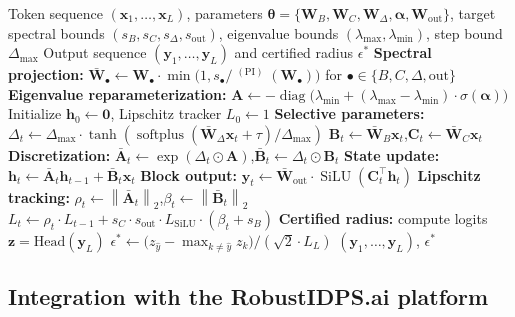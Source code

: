 \documentclass[journal,a4paper,10pt]{IEEEtran}
\theoremstyle{definition}
\theoremstyle{remark}
\newcommand{\modelname}{LipMamba}
\newcommand{\norm}[1]{\left\|#1\right\|}
\DeclareMathOperator{\softplus}{softplus}
\DeclareMathOperator{\diag}{diag}
\DeclareMathOperator{\sigmamax}{\sigma_{max}}
\DeclareMathOperator{\SiLU}{SiLU}
\begin{document}
\begin{algorithm}[!t]
\small
\caption{\modelname{} Forward Pass with Certified Radius}
\label{alg:lipmamba}
\begin{algorithmic}[1]
\REQUIRE Token sequence $(\mathbf{x}_1, \ldots, \mathbf{x}_L)$, parameters $\bm{\theta} = \{\mathbf{W}_B, \mathbf{W}_C, \mathbf{W}_\Delta, \bm{\alpha}, \mathbf{W}_{\mathrm{out}}\}$, target spectral bounds $(s_B, s_C, s_\Delta, s_{\mathrm{out}})$, eigenvalue bounds $(\lambda_{\max}, \lambda_{\min})$, step bound $\Delta_{\max}$
\ENSURE Output sequence $(\mathbf{y}_1, \ldots, \mathbf{y}_L)$ and certified radius $\epsilon^*$
\STATE \textbf{Spectral projection:} $\bar{\mathbf{W}}_\bullet \gets \mathbf{W}_\bullet \cdot \min\bigl(1, s_\bullet / \sigmamax^{\mathrm{(PI)}}(\mathbf{W}_\bullet)\bigr)$ for $\bullet \in \{B, C, \Delta, \mathrm{out}\}$ \quad {}
\STATE \textbf{Eigenvalue reparameterization:} $\mathbf{A} \gets -\diag\bigl(\lambda_{\min} + (\lambda_{\max} - \lambda_{\min}) \cdot \sigma(\bm{\alpha})\bigr)$
\STATE Initialize $\mathbf{h}_0 \gets \mathbf{0}$, Lipschitz tracker $L_0 \gets 1$
    \STATE \textbf{Selective parameters:} $\Delta_t \gets \Delta_{\max} \cdot \tanh(\softplus(\bar{\mathbf{W}}_\Delta \mathbf{x}_t + \tau) / \Delta_{\max})$
    \STATE \quad $\mathbf{B}_t \gets \bar{\mathbf{W}}_B \mathbf{x}_t$,\quad $\mathbf{C}_t \gets \bar{\mathbf{W}}_C \mathbf{x}_t$
    \STATE \textbf{Discretization:} $\bar{\mathbf{A}}_t \gets \exp(\Delta_t \odot \mathbf{A})$,\quad $\bar{\mathbf{B}}_t \gets \Delta_t \odot \mathbf{B}_t$
    \STATE \textbf{State update:} $\mathbf{h}_t \gets \bar{\mathbf{A}}_t \mathbf{h}_{t-1} + \bar{\mathbf{B}}_t \mathbf{x}_t$
    \STATE \textbf{Block output:} $\mathbf{y}_t \gets \bar{\mathbf{W}}_{\mathrm{out}} \cdot \SiLU(\mathbf{C}_t^\top \mathbf{h}_t)$
    \STATE \textbf{Lipschitz tracking:} $\rho_t \gets \norm{\bar{\mathbf{A}}_t}_2$,\quad $\beta_t \gets \norm{\bar{\mathbf{B}}_t}_2$
    \STATE \quad $L_t \gets \rho_t \cdot L_{t-1} + s_C \cdot s_{\mathrm{out}} \cdot L_{\SiLU} \cdot (\beta_t + s_B)$
\ENDFOR
\STATE \textbf{Certified radius:} compute logits $\mathbf{z} = \mathrm{Head}(\mathbf{y}_L)$
\STATE \quad $\epsilon^* \gets \bigl(z_{\hat{y}} - \max_{k \neq \hat{y}} z_k\bigr) / (\sqrt{2} \cdot L_L)$ \quad {}
\RETURN $(\mathbf{y}_1, \ldots, \mathbf{y}_L)$, $\epsilon^*$
\end{algorithmic}
\end{algorithm}

\subsection{Integration with the RobustIDPS.ai platform}
\label{subsec:platform}
\end{document}
